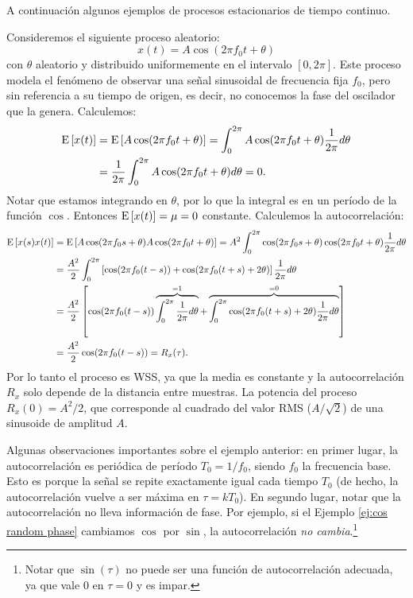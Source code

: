 A continuación algunos ejemplos de procesos estacionarios de tiempo continuo.

\begin{ejemplo}\label{ej:cos random phase}
Consideremos el siguiente proceso aleatorio:
\begin{equation*}
    x(t) = A\cos(2\pi f_0 t + \theta)
\end{equation*}
con $\theta$ aleatorio y distribuido uniformemente en el intervalo $[0,2\pi]$. Este proceso modela el fenómeno de observar una señal sinusoidal de frecuencia fija $f_0$, pero sin referencia a su tiempo de origen, es decir, no conocemos la fase del oscilador que la genera. Calculemos:
\begin{align*}
    \mathrm{E}\left[x(t)\right] &= \mathrm{E}\left[A\cos(2\pi f_0 t + \theta)\right] = \int_0^{2\pi} A\cos(2\pi f_0 t + \theta) \frac{1}{2\pi} d\theta \\
    &= \frac{1}{2\pi}\int_0^{2\pi} A\cos(2\pi f_0 t + \theta)  d\theta = 0.
\end{align*}
Notar que estamos integrando en $\theta$, por lo que la integral es en un período de la función $\cos$. Entonces $\mathrm{E}\left[x(t)\right] = \mu = 0$ constante. Calculemos la autocorrelación:
\begin{align*}
    \mathrm{E}\left[x(s)x(t)\right] &= \mathrm{E}\left[A\cos(2\pi f_0 s + \theta)A\cos(2\pi f_0 t + \theta)\right] = A^2 \int_0^{2\pi} \cos(2\pi f_0 s + \theta) \cos(2\pi f_0 t + \theta) \frac{1}{2\pi} d\theta \\
    &= \frac{A^2}{2}\int_0^{2\pi} \left[\cos(2\pi f_0 (t-s)) + \cos(2\pi f_0 (t+s) + 2\theta)\right] \frac{1}{2\pi} d\theta \\
    &= \frac{A^2}{2} \left[\cos(2\pi f_0 (t-s)) \overbrace{\int_0^{2\pi} \frac{1}{2\pi}d\theta}^{=1} + \overbrace{\int_0^{2\pi} \cos(2\pi f_0 (t+s) + 2\theta) \frac{1}{2\pi} d\theta}^{=0}\right] \\
    &= \frac{A^2}{2}\cos(2\pi f_0 (t-s)) = R_x(\tau).
\end{align*}
Por lo tanto el proceso es WSS, ya que la media es constante y la autocorrelación $R_x$ solo depende de la distancia entre muestras. La potencia del proceso $R_x(0) = A^2/2$, que corresponde al cuadrado del valor RMS ($A/\sqrt{2}$) de una sinusoide de amplitud $A$.
\end{ejemplo}

Algunas observaciones importantes sobre el ejemplo anterior: en primer lugar, la autocorrelación es periódica de período $T_0 = 1/f_0$, siendo $f_0$ la frecuencia base. Esto es porque la señal se repite exactamente igual cada tiempo $T_0$ (de hecho, la autocorrelación vuelve a ser máxima en $\tau=kT_0$). En segundo lugar, notar que la autocorrelación no lleva información de fase. Por ejemplo, si el Ejemplo \ref{ej:cos random phase} cambiamos $\cos$ por $\sin$, la autocorrelación \emph{no cambia}.\footnote{Notar que $\sin(\tau)$ no puede ser una función de autocorrelación adecuada, ya que vale $0$ en $\tau=0$ y es impar.} 


